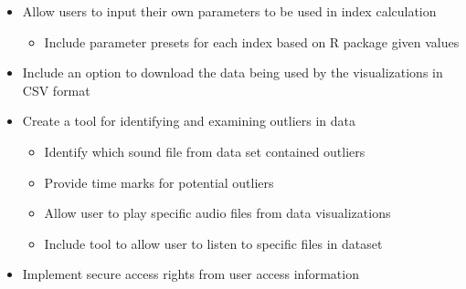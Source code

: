 \begin{itemize}
  \item Allow users to input their own parameters to be used in index calculation
    \begin{itemize}
      \item Include parameter presets for each index based on R package given values
    \end{itemize}
  \item Include an option to download the data being used by the visualizations in CSV format
  \item Create a tool for identifying and examining outliers in data
    \begin{itemize}
      \item Identify which sound file from data set contained outliers
      \item Provide time marks for potential outliers
      \item Allow user to play specific audio files from data visualizations
      \item Include tool to allow user to listen to specific files in dataset
    \end{itemize}
  \item Implement secure access rights from user access information
\end{itemize}
